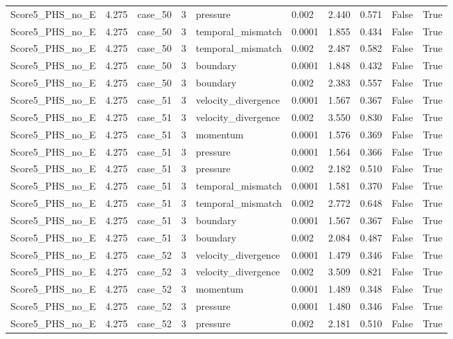 \begin{longtable}{llllllllll}
Score5\_PHS\_no\_E & 4.275 & case\_50 & 3 & pressure & 0.002 & 2.440 & 0.571 & False & True \\
Score5\_PHS\_no\_E & 4.275 & case\_50 & 3 & temporal\_mismatch & 0.0001 & 1.855 & 0.434 & False & True \\
Score5\_PHS\_no\_E & 4.275 & case\_50 & 3 & temporal\_mismatch & 0.002 & 2.487 & 0.582 & False & True \\
Score5\_PHS\_no\_E & 4.275 & case\_50 & 3 & boundary & 0.0001 & 1.848 & 0.432 & False & True \\
Score5\_PHS\_no\_E & 4.275 & case\_50 & 3 & boundary & 0.002 & 2.383 & 0.557 & False & True \\
Score5\_PHS\_no\_E & 4.275 & case\_51 & 3 & velocity\_divergence & 0.0001 & 1.567 & 0.367 & False & True \\
Score5\_PHS\_no\_E & 4.275 & case\_51 & 3 & velocity\_divergence & 0.002 & 3.550 & 0.830 & False & True \\
Score5\_PHS\_no\_E & 4.275 & case\_51 & 3 & momentum & 0.0001 & 1.576 & 0.369 & False & True \\
Score5\_PHS\_no\_E & 4.275 & case\_51 & 3 & pressure & 0.0001 & 1.564 & 0.366 & False & True \\
Score5\_PHS\_no\_E & 4.275 & case\_51 & 3 & pressure & 0.002 & 2.182 & 0.510 & False & True \\
Score5\_PHS\_no\_E & 4.275 & case\_51 & 3 & temporal\_mismatch & 0.0001 & 1.581 & 0.370 & False & True \\
Score5\_PHS\_no\_E & 4.275 & case\_51 & 3 & temporal\_mismatch & 0.002 & 2.772 & 0.648 & False & True \\
Score5\_PHS\_no\_E & 4.275 & case\_51 & 3 & boundary & 0.0001 & 1.567 & 0.367 & False & True \\
Score5\_PHS\_no\_E & 4.275 & case\_51 & 3 & boundary & 0.002 & 2.084 & 0.487 & False & True \\
Score5\_PHS\_no\_E & 4.275 & case\_52 & 3 & velocity\_divergence & 0.0001 & 1.479 & 0.346 & False & True \\
Score5\_PHS\_no\_E & 4.275 & case\_52 & 3 & velocity\_divergence & 0.002 & 3.509 & 0.821 & False & True \\
Score5\_PHS\_no\_E & 4.275 & case\_52 & 3 & momentum & 0.0001 & 1.489 & 0.348 & False & True \\
Score5\_PHS\_no\_E & 4.275 & case\_52 & 3 & pressure & 0.0001 & 1.480 & 0.346 & False & True \\
Score5\_PHS\_no\_E & 4.275 & case\_52 & 3 & pressure & 0.002 & 2.181 & 0.510 & False & True \\

\end{longtable}
